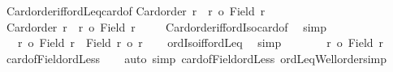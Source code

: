 \begin{isabellebody}
%
\isadelimproof
\isanewline
%
\endisadelimproof
\isanewline
{}\isamarkupfalse%
\ Card{\isacharunderscore}{\kern0pt}order{\isacharunderscore}{\kern0pt}iff{\isacharunderscore}{\kern0pt}ordLeq{\isacharunderscore}{\kern0pt}card{\isacharunderscore}{\kern0pt}of{\isacharcolon}{\kern0pt}\isanewline
{\isachardoublequoteopen}Card{\isacharunderscore}{\kern0pt}order\ r\ {\isacharequal}{\kern0pt}\ {\isacharparenleft}{\kern0pt}r\ {\isasymle}o\ {\isacharbar}{\kern0pt}Field\ r{\isacharbar}{\kern0pt}\ {\isacharparenright}{\kern0pt}{\isachardoublequoteclose}\isanewline
%
\isadelimproof
%
\endisadelimproof
%
\isatagproof
{}\isamarkupfalse%
{\isacharminus}{\kern0pt}\isanewline
\ \ \isamarkupfalse%
\ {\isachardoublequoteopen}Card{\isacharunderscore}{\kern0pt}order\ r\ {\isacharequal}{\kern0pt}\ {\isacharparenleft}{\kern0pt}r\ {\isacharequal}{\kern0pt}o\ {\isacharbar}{\kern0pt}Field\ r{\isacharbar}{\kern0pt}\ {\isacharparenright}{\kern0pt}{\isachardoublequoteclose}\isanewline
\ \ \isamarkupfalse%
\ Card{\isacharunderscore}{\kern0pt}order{\isacharunderscore}{\kern0pt}iff{\isacharunderscore}{\kern0pt}ordIso{\isacharunderscore}{\kern0pt}card{\isacharunderscore}{\kern0pt}of\ \isamarkupfalse%
\ simp\isanewline
\ \ \isamarkupfalse%
\ \isamarkupfalse%
\ {\isachardoublequoteopen}{\isachardot}{\kern0pt}{\isachardot}{\kern0pt}{\isachardot}{\kern0pt}\ {\isacharequal}{\kern0pt}\ {\isacharparenleft}{\kern0pt}r\ {\isasymle}o\ {\isacharbar}{\kern0pt}Field\ r{\isacharbar}{\kern0pt}\ {\isasymand}\ {\isacharbar}{\kern0pt}Field\ r{\isacharbar}{\kern0pt}\ {\isasymle}o\ r{\isacharparenright}{\kern0pt}{\isachardoublequoteclose}\isanewline
\ \ \isamarkupfalse%
\ ordIso{\isacharunderscore}{\kern0pt}iff{\isacharunderscore}{\kern0pt}ordLeq\ \isamarkupfalse%
\ simp\isanewline
\ \ \isamarkupfalse%
\ \isamarkupfalse%
\ {\isachardoublequoteopen}{\isachardot}{\kern0pt}{\isachardot}{\kern0pt}{\isachardot}{\kern0pt}\ {\isacharequal}{\kern0pt}\ {\isacharparenleft}{\kern0pt}r\ {\isasymle}o\ {\isacharbar}{\kern0pt}Field\ r{\isacharbar}{\kern0pt}\ {\isacharparenright}{\kern0pt}{\isachardoublequoteclose}\isanewline
\ \ \isamarkupfalse%
\ card{\isacharunderscore}{\kern0pt}of{\isacharunderscore}{\kern0pt}Field{\isacharunderscore}{\kern0pt}ordLess\isanewline
\ \ \isamarkupfalse%
\ {\isacharparenleft}{\kern0pt}auto\ simp{\isacharcolon}{\kern0pt}\ card{\isacharunderscore}{\kern0pt}of{\isacharunderscore}{\kern0pt}Field{\isacharunderscore}{\kern0pt}ordLess\ ordLeq{\isacharunderscore}{\kern0pt}Well{\isacharunderscore}{\kern0pt}order{\isacharunderscore}{\kern0pt}simp{\isacharparenright}{\kern0pt}\isanewline

\end{isabellebody}

